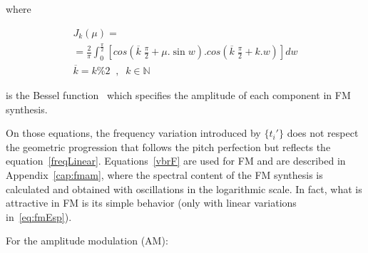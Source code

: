 \documentclass[
 aip,
 jmp,
 amsmath,amssymb,
 reprint,
]{revtex4-1}
\begin{document}
\noindent where

\begin{multline}\label{eq:Bessel}
J_k(\mu) = \\ = \frac{2}{\pi} \int_0^{\frac{\pi}{2}}\left [ cos \left (\overline{k}\;\frac{\pi}{2} + \mu . \sin w \right ) . cos \left ( \overline{k}\;\frac{\pi}{2} + k . w \right ) \right ] dw \\  \overline{k} = k \% 2 \;\;,\;\; k \in \mathbb{N}
\end{multline}

\noindent is the Bessel function~\cite{BesselCCRMA,JOSFM} which specifies the
amplitude of each component in FM synthesis.

On those equations, the frequency variation introduced by $\{t_i'\}$ does not
respect the geometric progression that follows the pitch perfection but reflects the
equation~\ref{freqLinear}. Equations~\ref{vbrF} are used for FM and are described
in Appendix~\ref{cap:fmam}, where the spectral content of the FM synthesis is
calculated and obtained with oscillations in the logarithmic scale. In
fact, what is attractive in FM is its simple behavior (only with linear
variations in~\ref{eq:fmEsp}).

For the amplitude modulation (AM): 

\newcommand{\OneColEqu}[1]{%
\end{multicols}%
\begin{twocolequfloat}%
\begin{equation}
\{t_i'\}_0^{\Lambda-1} =\{(1+a_i) . t_i\}_0^{\Lambda-1} = \left \{ \left [ 1+M.\sin \left ( f'.2\pi\frac{i}{f_a -1} \right ) \right] .P .\sin \left ( f.2\pi\frac{i}{f_a -1} \right ) \right \}_0^{\Lambda-1} = \\ 
                        =  \left\{P.\sin \left( f.2\pi\frac{i}{f_a -1}  \right ) +  \frac{P.M}{2} \left [ \sin \left( (f-f').2\pi\frac{i}{f_a -1}  \right )  + \sin \left( (f+f').2\pi\frac{i}{f_a -1}  \right ) \right ] \right \}_0^{\Lambda-1}
\end{equation}
\end{twocolequfloat}%
\begin{multicols}{2}%
}


\end{document}
